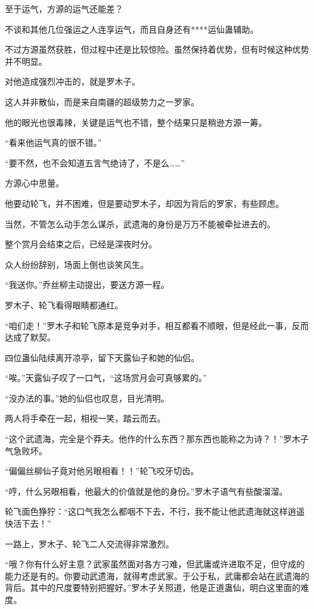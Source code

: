 \begin{this_body}
至于运气，方源的运气还能差？

不谈和其他几位强运之人连享运气，而且自身还有****运仙蛊辅助。

不过方源虽然获胜，但过程中还是比较惊险。虽然保持着优势，但有时候这种优势并不明显。

对他造成强烈冲击的，就是罗木子。

这人并非散仙，而是来自南疆的超级势力之一罗家。

他的眼光也很毒辣，关键是运气也不错，整个结果只是稍逊方源一筹。

“看来他运气真的很不错。”

“要不然，也不会知道五言气绝诗了，不是么……”

方源心中思量。

他要动轮飞，并不困难，但是要动罗木子，却因为背后的罗家，有些顾虑。

当然，不管怎么动手怎么谋杀，武遗海的身份是万万不能被牵扯进去的。

整个赏月会结束之后，已经是深夜时分。

众人纷纷辞别，场面上倒也谈笑风生。

“我送你。”乔丝柳主动提出，要送方源一程。

罗木子、轮飞看得眼睛都通红。

“咱们走！”罗木子和轮飞原本是竞争对手，相互都看不顺眼，但是经此一事，反而达成了默契。

四位蛊仙陆续离开凉亭，留下天露仙子和她的仙侣。

“唉。”天露仙子叹了一口气，“这场赏月会可真够累的。”

“没办法的事。”她的仙侣也叹息，目光清明。

两人将手牵在一起，相视一笑，踏云而去。

“这个武遗海，完全是个莽夫。他作的什么东西？那东西也能称之为诗？！”罗木子气急败坏。

“偏偏丝柳仙子竟对他另眼相看！！”轮飞咬牙切齿。

“哼，什么另眼相看，他最大的价值就是他的身份。”罗木子语气有些酸溜溜。

轮飞面色狰狞：“这口气我怎么都咽不下去，不行，我不能让他武遗海就这样逍遥快活下去！”

一路上，罗木子、轮飞二人交流得非常激烈。

“哦？你有什么好主意？武家虽然面对各方刁难，但武庸或许进取不足，但守成的能力还是有的。你要动武遗海，就得考虑武家。于公于私，武庸都会站在武遗海的背后。其中的尺度要特别把握好。”罗木子关照道，他是正道蛊仙，明白这里面的难度。


\end{this_body}
